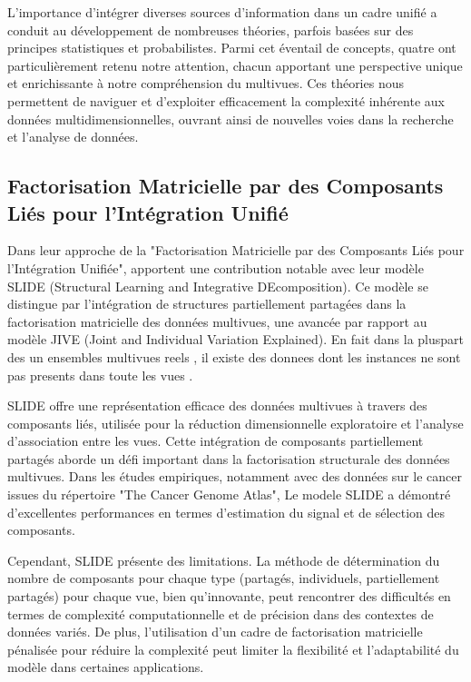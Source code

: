             L'importance d'intégrer diverses sources d'information dans un cadre unifié a conduit au développement de nombreuses théories, parfois basées sur des principes statistiques et probabilistes. Parmi cet éventail de concepts, quatre ont particulièrement retenu notre attention, chacun apportant une perspective unique et enrichissante à notre compréhension du multivues. Ces théories nous permettent de naviguer et d'exploiter efficacement la complexité inhérente aux données multidimensionnelles, ouvrant ainsi de nouvelles voies dans la recherche et l'analyse de données.
        \subsection{ Factorisation Matricielle par des Composants Liés pour l'Intégration Unifié}

            Dans leur approche de la  "Factorisation Matricielle par des Composants Liés pour l'Intégration Unifiée",\cite{IrinaGen2017} apportent une contribution notable avec leur modèle SLIDE (Structural Learning and Integrative DEcomposition). Ce modèle se distingue par l'intégration de structures partiellement partagées dans la factorisation matricielle des données multivues, une avancée par rapport au modèle JIVE (Joint and Individual Variation Explained)\cite{Lock2013JIVE}. En fait dans la pluspart des un ensembles multivues reels , il existe des donnees dont les instances ne sont pas presents dans toute les vues .  
                
            SLIDE offre une représentation efficace des données multivues à travers des composants liés, utilisée pour la réduction dimensionnelle exploratoire et l'analyse d'association entre les vues. Cette intégration de composants partiellement partagés aborde un défi important dans la factorisation structurale des données multivues. Dans les études empiriques, notamment avec des données sur le cancer issues du répertoire "The Cancer Genome Atlas", Le modele SLIDE a démontré d'excellentes performances en termes d'estimation du signal et de sélection des composants.

            Cependant, SLIDE présente des limitations. La méthode de détermination du nombre de composants pour chaque type (partagés, individuels, partiellement partagés) pour chaque vue, bien qu'innovante, peut rencontrer des difficultés en termes de complexité computationnelle et de précision dans des contextes de données variés. De plus, l'utilisation d'un cadre de factorisation matricielle pénalisée pour réduire la complexité peut limiter la flexibilité et l'adaptabilité du modèle dans certaines applications.
                
